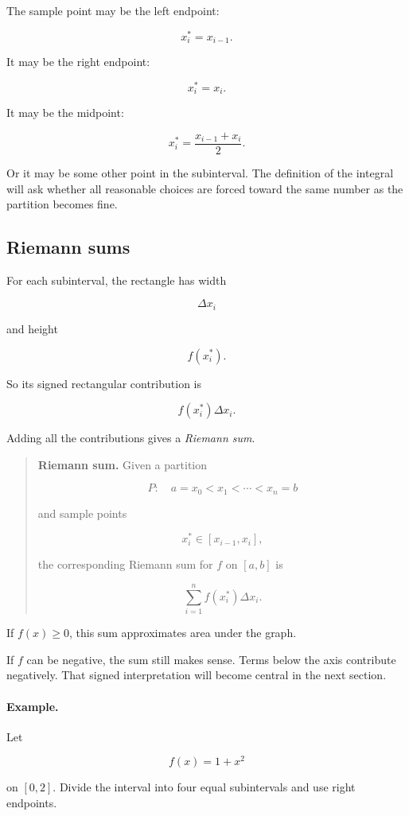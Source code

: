 The sample point may be the left endpoint:

\[
x_i^*=x_{i-1}.
\]

It may be the right endpoint:

\[
x_i^*=x_i.
\]

It may be the midpoint:

\[
x_i^*=\frac{x_{i-1}+x_i}{2}.
\]

Or it may be some other point in the subinterval.  The definition of the integral will
ask whether all reasonable choices are forced toward the same number as the partition
becomes fine.

\subsection{Riemann sums}
\label{subsec:riemann-sums}

For each subinterval, the rectangle has width

\[
\Delta x_i
\]

and height

\[
f(x_i^*).
\]

So its signed rectangular contribution is

\[
f(x_i^*)\Delta x_i.
\]

Adding all the contributions gives a \emph{Riemann sum}.

\begin{quote}
\textbf{Riemann sum.}
Given a partition

\[
P:\quad a=x_0<x_1<\cdots<x_n=b
\]

and sample points

\[
x_i^*\in[x_{i-1},x_i],
\]

the corresponding Riemann sum for \(f\) on \([a,b]\) is

\[
\boxed{
\sum_{i=1}^{n} f(x_i^*)\Delta x_i.
}
\]
\end{quote}

If \(f(x)\ge0\), this sum approximates area under the graph.

If \(f\) can be negative, the sum still makes sense.  Terms below the axis contribute
negatively.  That signed interpretation will become central in the next section.

\paragraph{Example.}
Let

\[
f(x)=1+x^2
\]

on \([0,2]\).  Divide the interval into four equal subintervals and use right endpoints.

